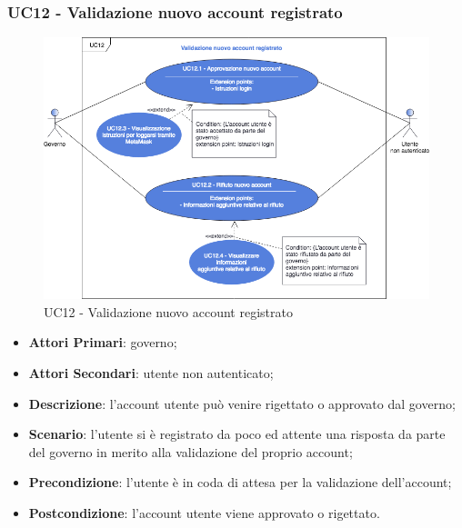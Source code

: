 \subsubsection{UC12 - Validazione nuovo account registrato}
\begin{figure}[h]
	\includegraphics[width=15.5cm]{res/images/UC12Validazione.png} %
	\centering
	\caption{UC12 - Validazione nuovo account registrato}
	
\end{figure}
\begin{itemize}
	\item \textbf{Attori Primari}:
	governo;
	\item \textbf{Attori Secondari}:
	utente non autenticato;
	\item \textbf{Descrizione}: l'account utente può venire rigettato o approvato dal governo;
	\item \textbf{Scenario}: l'utente si è registrato da poco ed attente una risposta da parte del governo in merito alla validazione del proprio account;
	\item \textbf{Precondizione}: l'utente è in coda di attesa per la validazione dell'account;
	\item \textbf{Postcondizione}: l'account utente viene approvato o rigettato. 
\end{itemize}
